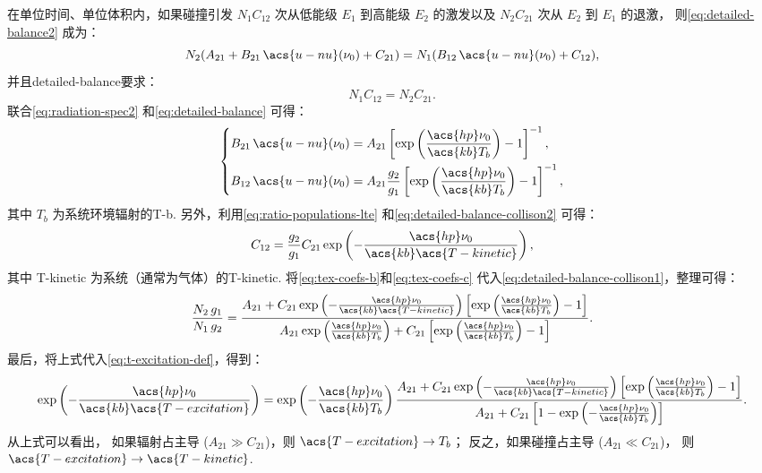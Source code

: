 在单位时间、单位体积内，如果碰撞引发 $N_1 C_{12}$ 次从低能级 $E_1$ 到高能级 $E_2$
的激发以及 $N_2 C_{21}$ 次从 $E_2$ 到 $E_1$ 的退激，
则\autoref{eq:detailed-balance2} 成为：
\begin{equation}
  \label{eq:detailed-balance-collison1}
  N_2 (A_{21} + B_{21} \,\acs{u-nu}(\nu_0) + C_{21})
    = N_1 (B_{12} \,\acs{u-nu}(\nu_0) + C_{12}) ,
\end{equation}
并且\ac{detailed-balance}要求：
\begin{equation}
  \label{eq:detailed-balance-collison2}
  N_1 C_{12} = N_2 C_{21} .
\end{equation}
联合\autoref{eq:radiation-spec2} 和\autoref{eq:detailed-balance} 可得：
\begin{equation}
  \label{eq:tex-coefs-b}
  \left\{
  \begin{aligned}
    B_{21} \,\acs{u-nu}(\nu_0) & =
      A_{21} \left[ \exp\left(
        \frac{\acs{hp} \nu_0}{\acs{kb} T_b} \right) - 1 \right]^{-1} , \\
    B_{12} \,\acs{u-nu}(\nu_0) & =
      A_{21} \frac{g_2}{g_1} \left[ \exp\left(
        \frac{\acs{hp} \nu_0}{\acs{kb} T_b} \right) - 1 \right]^{-1} ,
  \end{aligned}
  \right.
\end{equation}
其中 $T_b$ 为系统环境辐射的\acl{T-b}.
另外，利用\autoref{eq:ratio-populations-lte}
和\autoref{eq:detailed-balance-collison2} 可得：
\begin{equation}
  \label{eq:tex-coefs-c}
  C_{12} = \frac{g_2}{g_1} C_{21}
    \exp\left( - \frac{\acs{hp} \nu_0}{\acs{kb} \acs{T-kinetic}} \right) ,
\end{equation}
其中 \acs{T-kinetic} 为系统（通常为气体）的\acl{T-kinetic}.
将\autoref{eq:tex-coefs-b}和\autoref{eq:tex-coefs-c}
代入\autoref{eq:detailed-balance-collison1}，整理可得：
\begin{equation}
  \frac{N_2\,g_1}{N_1\,g_2} =
    \frac{A_{21} + C_{21}
    \exp\left( -\frac{\acs{hp} \nu_0}{\acs{kb} \acs{T-kinetic}} \right)
      \left[ \exp\left( \frac{\acs{hp} \nu_0}{\acs{kb} T_b} \right)
        - 1 \right]
    }{A_{21} \exp\left( \frac{\acs{hp} \nu_0}{\acs{kb} T_b} \right)
     + C_{21} \left[ \exp\left( \frac{\acs{hp} \nu_0}{\acs{kb} T_b}
       \right) - 1 \right]} .
\end{equation}
最后，将上式代入\autoref{eq:t-excitation-def}，得到：
\begin{equation}
  \label{eq:t-excitation}
  \exp\left(- \frac{\acs{hp} \nu_0}{\acs{kb} \acs{T-excitation}} \right) =
    \exp\left( -\frac{\acs{hp} \nu_0}{\acs{kb} T_b} \right)
    \frac{A_{21} + C_{21} \exp\left(
      -\frac{\acs{hp} \nu_0}{\acs{kb} \acs{T-kinetic}} \right)
      \left[ \exp\left( \frac{\acs{hp} \nu_0}{\acs{kb} T_b} \right)
        - 1 \right]
    }{A_{21} + C_{21} \left[ 1 - \exp\left(
      -\frac{\acs{hp} \nu_0}{\acs{kb} T_b} \right) \right]} .
\end{equation}
从上式可以看出，
如果辐射占主导 ($A_{21} \gg C_{21}$)，则 $\acs{T-excitation} \to T_b$；
反之，如果碰撞占主导 ($A_{21} \ll C_{21}$)，
则 $\acs{T-excitation} \to \acs{T-kinetic}$.


